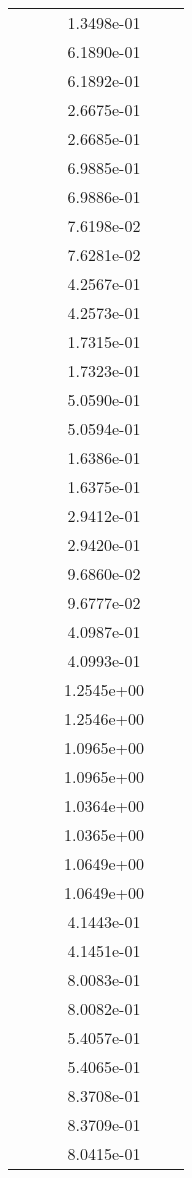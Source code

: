 \begin{xltabular}{\textwidth}{r|rS[table-format=1.3e+2]S[table-format=1.4e+2]S[table-format=1.4e+2]S[table-format=-1.5]}
&  &  & 1.3498e-01 & & \\
&  &  & 6.1890e-01 & & \\
&  &  & 6.1892e-01 & & \\
&  &  & 2.6675e-01 & & \\
&  &  & 2.6685e-01 & & \\
&  &  & 6.9885e-01 & & \\
&  &  & 6.9886e-01 & & \\
&  &  & 7.6198e-02 & & \\
&  &  & 7.6281e-02 & & \\
&  &  & 4.2567e-01 & & \\
&  &  & 4.2573e-01 & & \\
&  &  & 1.7315e-01 & & \\
&  &  & 1.7323e-01 & & \\
&  &  & 5.0590e-01 & & \\
&  &  & 5.0594e-01 & & \\
&  &  & 1.6386e-01 & & \\
&  &  & 1.6375e-01 & & \\
&  &  & 2.9412e-01 & & \\
&  &  & 2.9420e-01 & & \\
&  &  & 9.6860e-02 & & \\
&  &  & 9.6777e-02 & & \\
&  &  & 4.0987e-01 & & \\
&  &  & 4.0993e-01 & & \\
&  &  & 1.2545e+00 & & \\
&  &  & 1.2546e+00 & & \\
&  &  & 1.0965e+00 & & \\
&  &  & 1.0965e+00 & & \\
&  &  & 1.0364e+00 & & \\
&  &  & 1.0365e+00 & & \\
&  &  & 1.0649e+00 & & \\
&  &  & 1.0649e+00 & & \\
&  &  & 4.1443e-01 & & \\
&  &  & 4.1451e-01 & & \\
&  &  & 8.0083e-01 & & \\
&  &  & 8.0082e-01 & & \\
&  &  & 5.4057e-01 & & \\
&  &  & 5.4065e-01 & & \\
&  &  & 8.3708e-01 & & \\
&  &  & 8.3709e-01 & & \\
&  &  & 8.0415e-01 & & \\

\end{xltabular}
